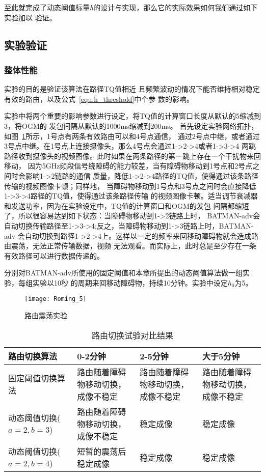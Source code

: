 至此就完成了动态阈值标量\emph{h}的设计与实现，那么它的实际效果如何我们通过如下实验加以
验证。

\subsection{实验验证}
\renewcommand{\thesubsubsection}{\Alph{subsubsection}.}
\subsubsection{整体性能}
实验的目的是验证该算法在路径TQ值相近
且频繁波动的情况下能否维持相对稳定有效的路由，以及公式~\ref{equ:h_threshold}中个参
数的影响。

实验中将两个重要的影响参数进行设定，将TQ值的计算窗口长度从默认的5缩减到3，将OGM的
发包间隔从默认的1000ms缩减到200ms。
首先设定实验网络拓扑，如图~\ref{fig:roming_5}所示，1号点有两条有效路由可以和4号点通信，
通过2号点中继，或者通过3号点中继。在1号点上连接摄像头，那么4号点会通过1->2->4或者1->3->4
两跳路径收到摄像头的视频图像。此时如果在两条路径的第一跳上存在一个干扰物来回移动，
因为5GHz频段信号绕障碍的能力较差，当有障碍物移动到1号点和2号点之间时会影响1->2链路的通信
质量，降低1->2->4路径的TQ值，使得通过该条路径传输的视频图像卡顿；同样地，
当障碍物移动到1号点和3号点之间时会直接降低1->3->4路径的TQ值，使得通过该条路径传输
的视频图像卡顿。适当调节衰减器和发送功率，因为在实验设定中，TQ值的计算窗口和OGM的发包
间隔都缩短了，所以很容易达到如下状态：当障碍物移动到1->2链路上时，
BATMAN-adv会自动切换传输路径至1->3->4;反之，当障碍物移动到1->3链路上时，BATMAN-adv
会自动切换到路径1->2->4上。这样以一定的频率来回移动障碍物就会造成路由震荡，无法正常传输数据，视频
无法观看。而实际上，此时总是至少存在一条有效路径可以进行数据传递的。

分别对BATMAN-adv所使用的固定阈值和本章所提出的动态阈值算法做一组实验，每组实验以10秒
的周期来回移动障碍物，持续10分钟。实验中设定$h_{0}$为5。

\begin{figure}[H] %
  \centering
  \texttt{[image: Roming\_5]}
  \caption{路由震荡实验}
  \label{fig:roming_5}
\end{figure}

\begin{table}[htbp]
  \centering
  \caption{路由切换试验对比结果}
  \label{tab:roming_tab_1}
  \begin{tabular}{|p{3cm}|p{3cm}|p{3cm}|p{3cm}|}
  \hline
  路由切换算法 & 0-2分钟 & 2-5分钟 & 大于5分钟 \\
  \hline
  固定阈值切换算法 & 路由随着障碍物移动切换，成像不稳定 & 路由随着障碍物移动切换，成像不稳定& 路由随着障碍物移动切换，成像不稳定\\
  \hline
  动态阈值切换($a=2, b=3$) & 路由随着障碍物移动切换，成像不稳定 & 稳定成像 & 稳定成像\\
  \hline
  动态阈值切换($a=2, b=4$) & 短暂的震荡后稳定成像 & 稳定成像 & 稳定成像\\
  \hline
  \end{tabular}
\end{table}

